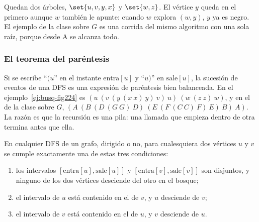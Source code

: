 \documentclass[11pt,letterpaper]{article}
\begin{document}
\begin{ejemplo}
\begin{center}
  \end{center}
  Quedan dos árboles, $\set{u, v, y, x}$ y $\set{w, z}$. El vértice
  $y$ queda en el primero aunque $w$ también le apunte: cuando $w$
  explora $(w, y)$, $y$ ya es negro. El ejemplo de la clase sobre $G$
  es una corrida del mismo algoritmo con una sola raíz, porque desde A
  se alcanza todo.
\end{ejemplo}

\subsubsection*{El teorema del paréntesis}

Si se escribe ``$(u$'' en el instante $\text{entra}[u]$ y ``$u)$'' en
$\text{sale}[u]$, la sucesión de eventos de una DFS es una expresión
de paréntesis bien balanceada. En el ejemplo~\ref{ej:busq-fig224} es
$(u\ (v\ (y\ (x\ x)\ y)\ v)\ u)\ (w\ (z\ z)\ w)$, y en el de la clase
sobre $G$,
$(A\ (B\ (D\ (G\ G)\ D)\ (E\ (F\ (C\ C)\ F)\ E)\ B)\ A)$. La razón es
que la recursión es una pila: una llamada que empieza dentro de otra
termina antes que ella.

\begin{teorema}
  \label{teo:busq-parentesis}
  En cualquier DFS de un grafo, dirigido o no, para cualesquiera dos
  vértices $u$ y $v$ se cumple exactamente una de estas tres
  condiciones:
  \begin{enumerate}[itemsep=0.1em]
    \item los intervalos $[\text{entra}[u], \text{sale}[u]]$ y
      $[\text{entra}[v], \text{sale}[v]]$ son disjuntos, y ninguno de
      los dos vértices desciende del otro en el bosque;
    \item el intervalo de $u$ está contenido en el de $v$, y $u$
      desciende de $v$;
    \item el intervalo de $v$ está contenido en el de $u$, y $v$
      desciende de $u$.
  \end{enumerate}
\end{teorema}
\end{document}

